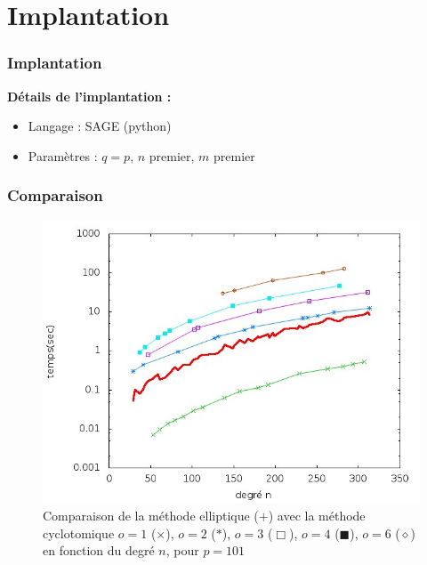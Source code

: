 \documentclass{beamer} %
\numberwithin{equation}{section}
\begin{document}
\section{Implantation}
\begin{frame}
\frametitle{Implantation}
\textbf{Détails de l'implantation :}\\
\begin{itemize}
\item Langage : SAGE (python)
\item Paramètres : $q = p$, $n$ premier, $m$ premier
\end{itemize}

\end{frame}
\begin{frame}
\frametitle{Comparaison}
\begin{figure}
\begin{center}
\includegraphics[scale=0.5]{testrc3}
\caption*{\scriptsize Comparaison de la méthode elliptique
(\textcolor{elliptique}{$+$}) avec la méthode cyclotomique $o = 1$
 (\textcolor{o1}{$\times$}), $o = 2$ (\textcolor{o2}{$*$}), $o = 3$ 
(\textcolor{o3}{$\Box$}), $o = 4$ (\textcolor{o4}{$\blacksquare$}), $o = 6$ 
(\textcolor{o6}{$\diamond$}) en fonction du degré $n$, pour $p = 101$}
\end{center}
\end{figure}

\end{frame}
\end{document}
